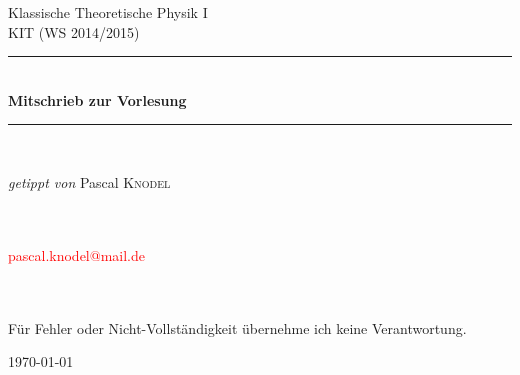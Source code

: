 

\begin{titlepage}
	
	\begin{center}
		
		\textsf{\LARGE Klassische Theoretische Physik I}\\[1.5cm]
		
		\textsc{\Large KIT (WS 2014/2015)}\\[1.25cm]
		
		\newcommand{\HRule}{\rule{\linewidth}{0.25mm}}
		\HRule \\[0.4cm]
		{ \Large \bfseries Mitschrieb zur Vorlesung}
		\HRule \\[1.5cm]
		
		\begin{minipage}{0.5\textwidth}
			\begin{flushleft} \large
				\emph{getippt von} \quad Pascal \textsc{Knodel} 
				
				~\\~\\
				
				\textcolor{red}{pascal.knodel@mail.de}
				
				~\\~\\
				
				Für Fehler oder Nicht-Vollständigkeit übernehme ich keine Verantwortung.
				
			\end{flushleft}
		\end{minipage}
		\hfill
		
		
		\vfill
		
		{\large \today}
		
	\end{center}
	
\end{titlepage}


